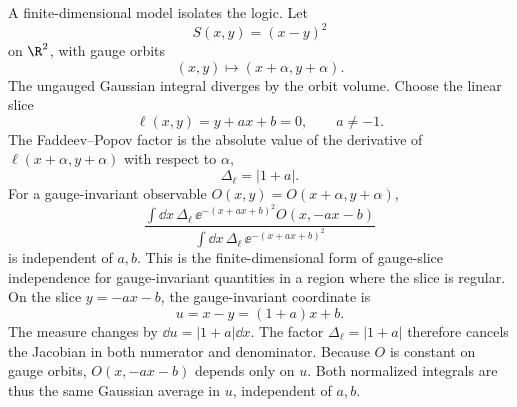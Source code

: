 \begin{center}
\end{center}

\begin{example}
\label{prop:finite-dimensional-fp-slice-independence-model}
A finite-dimensional model isolates the logic. Let
\[
  S(x,y)=(x-y)^2
\]
on \(\R^2\), with gauge orbits
\[
  (x,y)\longmapsto(x+\alpha,y+\alpha).
\]
The ungauged Gaussian integral diverges by the orbit volume. Choose the
linear slice
\[
  \ell(x,y)=y+ax+b=0,
  \qquad a\ne -1.
\]
The Faddeev--Popov factor is the absolute value of the derivative of
\(\ell(x+\alpha,y+\alpha)\) with respect to \(\alpha\),
\[
  \Delta_\ell=|1+a|.
\]
For a gauge-invariant observable \(O(x,y)=O(x+\alpha,y+\alpha)\),
\[
  \frac{
    \int\dd x\,\Delta_\ell\,
    \ee^{-(x+ax+b)^2}O(x,-ax-b)
  }{
    \int\dd x\,\Delta_\ell\,
    \ee^{-(x+ax+b)^2}
  }
\]
is independent of \(a,b\). This is the finite-dimensional form of
gauge-slice independence for gauge-invariant quantities in a region where the
slice is regular.
On the slice \(y=-ax-b\), the gauge-invariant coordinate is
\[
  u=x-y=(1+a)x+b .
\]
The measure changes by \(\dd u=|1+a|\dd x\).  The factor
\(\Delta_\ell=|1+a|\) therefore cancels the Jacobian in both numerator and
denominator.  Because \(O\) is constant on gauge orbits, \(O(x,-ax-b)\)
depends only on \(u\).  Both normalized integrals are thus the same Gaussian
average in \(u\), independent of \(a,b\).
\end{example}

